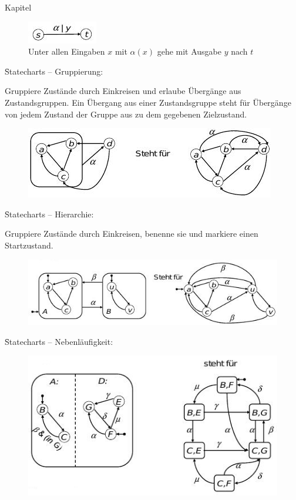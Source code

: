 \begin{chapter}{Kapitel}
\begin{figure}[!ht]
 \centering
 \includegraphics{pics/statechart}
 \caption{Unter allen Eingaben $x$ mit $\alpha(x)$ gehe mit Ausgabe $y$ nach $t$}
\end{figure}

\f{Statecharts -- Gruppierung}:

\noindent Gruppiere Zustände durch Einkreisen und erlaube Übergänge aus Zustandsgruppen. Ein Übergang aus einer Zustandsgruppe steht für Übergänge von jedem Zustand der 
Gruppe aus zu dem gegebenen Zielzustand. 

\begin{figure}[!ht]
 \centering
 \includegraphics[scale=0.85]{pics/stateUebergang}
\end{figure}

\f{Statecharts -- Hierarchie}:

\noindent Gruppiere Zustände durch Einkreisen, benenne sie und markiere einen Startzustand. 
\begin{figure}[!ht]
 \centering
 \includegraphics[scale=0.85]{pics/stateHierarchie}
\end{figure}

\f{Statecharts -- Nebenläufigkeit}:

\begin{figure}[!ht]
 \centering
 \includegraphics[scale=0.9]{pics/stateNeben}
\end{figure}


\end{chapter}
